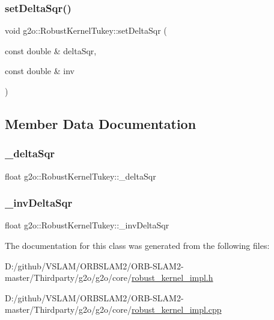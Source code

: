 \subsubsection{\texorpdfstring{set\+Delta\+Sqr()}{setDeltaSqr()}}
{\footnotesize\ttfamily void g2o\+::\+Robust\+Kernel\+Tukey\+::set\+Delta\+Sqr (\begin{DoxyParamCaption}\item[{const double \&}]{delta\+Sqr,  }\item[{const double \&}]{inv }\end{DoxyParamCaption})\hspace{0.3cm}{\ttfamily [virtual]}}



\subsection{Member Data Documentation}
\mbox{\label{classg2o_1_1_robust_kernel_tukey_a3964d90966fa04e5d8002c1c52bda718}} 
\subsubsection{\texorpdfstring{\+\_\+delta\+Sqr}{\_deltaSqr}}
{\footnotesize\ttfamily float g2o\+::\+Robust\+Kernel\+Tukey\+::\+\_\+delta\+Sqr\hspace{0.3cm}{\ttfamily [private]}}

\mbox{\label{classg2o_1_1_robust_kernel_tukey_addca0bfe5d4cafbe0a030c645efd2754}} 
\subsubsection{\texorpdfstring{\+\_\+inv\+Delta\+Sqr}{\_invDeltaSqr}}
{\footnotesize\ttfamily float g2o\+::\+Robust\+Kernel\+Tukey\+::\+\_\+inv\+Delta\+Sqr\hspace{0.3cm}{\ttfamily [private]}}



The documentation for this class was generated from the following files\+:\begin{DoxyCompactItemize}
\item 
D\+:/github/\+V\+S\+L\+A\+M/\+O\+R\+B\+S\+L\+A\+M2/\+O\+R\+B-\/\+S\+L\+A\+M2-\/master/\+Thirdparty/g2o/g2o/core/\mbox{\hyperlink{robust__kernel__impl_8h}{robust\+\_\+kernel\+\_\+impl.\+h}}\item 
D\+:/github/\+V\+S\+L\+A\+M/\+O\+R\+B\+S\+L\+A\+M2/\+O\+R\+B-\/\+S\+L\+A\+M2-\/master/\+Thirdparty/g2o/g2o/core/\mbox{\hyperlink{robust__kernel__impl_8cpp}{robust\+\_\+kernel\+\_\+impl.\+cpp}}\end{DoxyCompactItemize}
